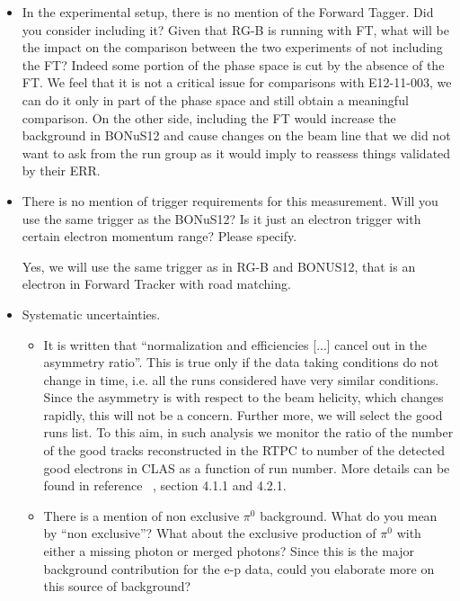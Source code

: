\begin{itemize}
\item In the experimental setup, there is no mention of the Forward Tagger.  
   Did you consider including it? Given that RG-B is running with FT, what will 
   be the impact on the comparison between the two experiments of not including 
   the FT?
{\color{red} Indeed some portion of the phase space is cut by the absence of 
the FT. We feel that it is not a critical issue for comparisons with 
E12-11-003, we can do it only in part of the phase space and still obtain
a meaningful comparison. On the other side, including the FT would increase the 
background in BONuS12 and cause changes on the beam line that we did not want 
to ask from the run group as it would imply to reassess things validated by 
their ERR.}

\item There is no mention of trigger requirements for this measurement. Will 
   you use the same trigger as the BONuS12? Is it just an electron trigger with 
   certain electron momentum range? Please specify.
  
{\color{red} Yes, we will use the same trigger as in RG-B and BONUS12, that is 
an electron in Forward Tracker with road matching.}

\item Systematic uncertainties.  \begin{itemize}
\item  It is written that ``normalization and efficiencies [...] cancel out in 
   the asymmetry ratio''. This is true only if the data taking conditions do 
      not change in time, i.e. all the runs considered have very similar 
      conditions.\\
{\color{red}Since the asymmetry is with respect to the beam helicity, which 
      changes rapidly, this will not be a concern. Further more, we will select 
      the good runs list.  To this aim, in such analysis we monitor the ratio 
      of the number of the good tracks reconstructed in the RTPC to number of 
      the detected good electrons in CLAS as a function of run number. More 
      details can be found in reference ~\cite{eg6_note}, section 4.1.1 and 
      4.2.1. }

 \item There is a mention of non exclusive $\pi^0$ background. What do you mean 
    by ``non exclusive''? What about the exclusive production of $\pi^0$ with 
      either a missing photon or merged photons? Since this is the major 
      background contribution for the e-p data, could you elaborate more on 
      this source of background?


\end{itemize}
\end{itemize}
